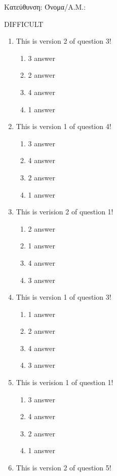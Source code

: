 \documentclass[a4paper, 11pt]{article}
\begin{document}
{\flushleft Κατεύθυνση: }
{\flushleft Όνομα/Α.Μ.: }
\vspace*{0.5cm}
\begin{center} {\Large  DIFFICULT } \end{center}
\begin{enumerate}
\item This is version 2 of question 3!
\begin{enumerate}[(1)]
    \item 3 answer
    \item 2 answer
    \item 4 answer
    \item 1 answer
\end{enumerate}
\item This is version 1 of question 4!
\begin{enumerate}[(1)]
    \item 3 answer
    \item 4 answer
    \item 2 answer
    \item 1 answer
\end{enumerate}
\item This is verision 2 of question 1!
\begin{enumerate}[(1)]
    \item 2 answer
    \item 1 answer
    \item 4 answer
    \item 3 answer
\end{enumerate}
\item This is version 1 of question 3!
\begin{enumerate}[(1)]
    \item 1 answer
    \item 2 answer
    \item 4 answer
    \item 3 answer
\end{enumerate}
\item This is verision 1 of question 1!
\begin{enumerate}[(1)]
    \item 3 answer
    \item 4 answer
    \item 2 answer
    \item 1 answer
\end{enumerate}
\item This is version 2 of question 5!
\begin{enumerate}[(1)]

\end{enumerate}
\end{enumerate}
\end{document}
